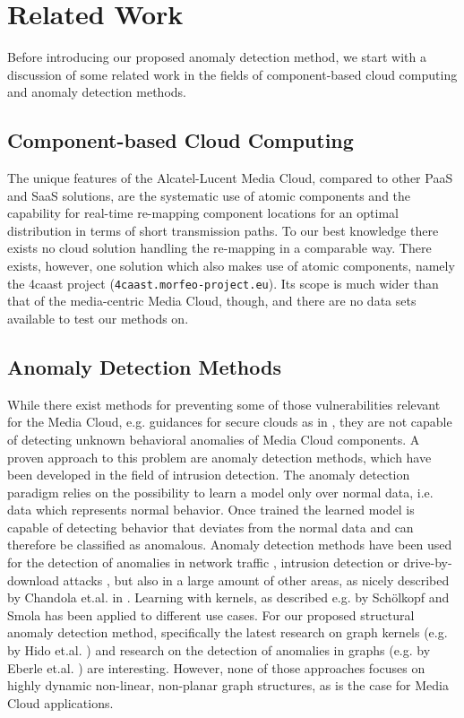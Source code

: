 \documentclass{llncs}
\begin{document}
\section{Related Work}
\label{relatedwork}

Before introducing our proposed anomaly detection method, we start with a discussion of some related work in the fields of component-based cloud computing and anomaly detection methods.

\subsection{Component-based Cloud Computing}
\label{componentbasedcloudcomputing}
The unique features of the Alcatel-Lucent Media Cloud, compared to other PaaS and SaaS solutions, are the systematic use of atomic components and the capability for real-time re-mapping component locations for an optimal distribution in terms of short transmission paths. To our best knowledge there exists no cloud solution handling the re-mapping in a comparable way. There exists, however, one solution which also makes use of atomic components, namely the 4caast project (\texttt{4caast.morfeo-project.eu}). Its scope is much wider than that of the media-centric Media Cloud, though, and there are no data sets available to test our methods on.

\subsection{Anomaly Detection Methods}
\label{anomalydetectionmethods}
While there exist methods for preventing some of those vulnerabilities relevant for the Media Cloud, e.g. guidances for secure clouds as in \cite{JanGra11,SulBonFurOrr13}, they are not capable of detecting unknown behavioral anomalies of Media Cloud components. A proven approach to this problem are anomaly detection methods, which have been developed in the field of intrusion detection. The anomaly detection paradigm relies on the possibility to learn a model only over normal data, i.e. data which represents normal behavior.  Once trained the learned model is capable of detecting behavior that deviates from the normal data and can therefore be classified as anomalous. Anomaly detection methods have been used for the detection of anomalies in network traffic \cite{BarKliPloRon02,LakCroDio05,LiCroDioGovIanLak06}, intrusion detection \cite{WanParSto06,IngIno07} or drive-by-download attacks \cite{CovKruVig10,SchBikKruRie12}, but also in a large amount of other areas, as nicely described by Chandola et.al. in \cite{ChaBanKum09}. 
Learning with kernels, as described e.g. by Sch\"olkopf and Smola \cite{SchSmo02} has been applied to different use cases. For our proposed structural anomaly detection method, specifically the latest research on graph kernels (e.g. by Hido et.al. \cite{HidKas09}) and research on the detection of anomalies in graphs (e.g. by Eberle et.al. \cite{EbeHol07}) are interesting. However, none of those approaches focuses on highly dynamic non-linear, non-planar graph structures, as is the case for Media Cloud applications.
 
\end{document}
